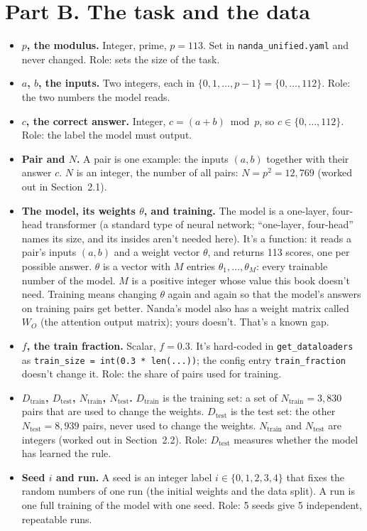 \documentclass[11pt,a4paper,oneside,openany]{report}
\newcommand{\Ntrain}{N_{\mathrm{train}}}
\newcommand{\Ntest}{N_{\mathrm{test}}}
\newcommand{\Dtrain}{D_{\mathrm{train}}}
\newcommand{\Dtest}{D_{\mathrm{test}}}
\newcommand{\code}[1]{\texttt{#1}}
\newcommand{\gl}[1]{\textbf{#1}}   %
\newenvironment{glist}{\begin{itemize}\setlength{\itemsep}{2pt}\setlength{\parskip}{1pt}}{\end{itemize}}
\begin{document}
\section*{Part B. The task and the data}

\begin{glist}
\item[\gl{N1}] \textbf{$p$, the modulus.} Integer, prime, $p = 113$. Set in \code{nanda\_\allowbreak{}unified.yaml} and never changed. Role: sets the size of the task.
\item[\gl{N2}] \textbf{$a$, $b$, the inputs.} Two integers, each in $\{0, 1, \ldots, p-1\} = \{0, \ldots, 112\}$. Role: the two numbers the model reads.
\item[\gl{N3}] \textbf{$c$, the correct answer.} Integer, $c = (a+b) \bmod p$, so $c \in \{0, \ldots, 112\}$. Role: the label the model must output.
\item[\gl{N4}] \textbf{Pair and $N$.} A pair is one example: the inputs $(a, b)$ together with their answer $c$. $N$ is an integer, the number of all pairs: $N = p^2 = 12{,}769$ (worked out in Section~2.1).
\item[\gl{N5}] \textbf{The model, its weights $\theta$, and training.} The model is a one-layer, four-head transformer (a standard type of neural network; ``one-layer, four-head'' names its size, and its insides aren't needed here). It's a function: it reads a pair's inputs $(a, b)$ and a weight vector $\theta$, and returns 113 scores, one per possible answer. $\theta$ is a vector with $M$ entries $\theta_1, \ldots, \theta_M$: every trainable number of the model. $M$ is a positive integer whose value this book doesn't need. Training means changing $\theta$ again and again so that the model's answers on training pairs get better. Nanda's model also has a weight matrix called $W_O$ (the attention output matrix); yours doesn't. That's a known gap.
\item[\gl{N6}] \textbf{$f$, the train fraction.} Scalar, $f = 0.3$. It's hard-coded in \code{get\_\allowbreak{}dataloaders} as \code{train\_\allowbreak{}size = int(0.3 * len(...))}; the config entry \code{train\_\allowbreak{}fraction} doesn't change it. Role: the share of pairs used for training.
\item[\gl{N7}] \textbf{$\Dtrain$, $\Dtest$, $\Ntrain$, $\Ntest$.} $\Dtrain$ is the training set: a set of $\Ntrain = 3{,}830$ pairs that are used to change the weights. $\Dtest$ is the test set: the other $\Ntest = 8{,}939$ pairs, never used to change the weights. $\Ntrain$ and $\Ntest$ are integers (worked out in Section~2.2). Role: $\Dtest$ measures whether the model has learned the rule.
\item[\gl{N8}] \textbf{Seed $i$ and run.} A seed is an integer label $i \in \{0, 1, 2, 3, 4\}$ that fixes the random numbers of one run (the initial weights and the data split). A run is one full training of the model with one seed. Role: 5 seeds give 5 independent, repeatable runs.
\end{glist}
\end{document}
